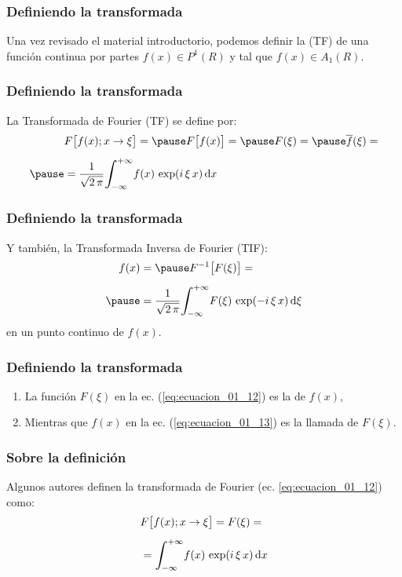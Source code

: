 \begin{frame}
\frametitle{Definiendo la transformada}
Una vez revisado el material introductorio, \pause podemos definir la  (TF) de una función continua por partes $f (x) \in P^{1} (R)$ y tal que $f (x) \in A_{1} (R)$.
\end{frame}
\begin{frame}
\frametitle{Definiendo la transformada}
La Transformada de Fourier (TF) se define por:
\pause
\begin{eqnarray}
\begin{aligned}[b]
&F \big[ f (x); x \to \xi \big] = \pause F \big[ f (x) \big] = \pause F (\xi) = \pause \overline{f} (\xi) = \\[0.5em] \pause
&= \dfrac{1}{\sqrt{2 \, \pi}} \scaleint{6ex}_{\bs -\infty}^{+\infty} f (x) \, \exp(i \, \xi \, x) \dd{x}
\end{aligned}
\label{eq:ecuacion_01_12}
\end{eqnarray}
\end{frame}
\begin{frame}
\frametitle{Definiendo la transformada}
Y también, la Transformada Inversa de Fourier (TIF):
\pause
\begin{eqnarray}
\begin{aligned}[b]
f (x) &= \pause F^{-1} \big[ F (\xi) \big] = \\[0.5em] \pause
&= \dfrac{1}{\sqrt{2 \, \pi}} \scaleint{6ex}_{\bs -\infty}^{+\infty} F (\xi) \, \exp(-i \, \xi \, x) \dd{\xi}
\label{eq:ecuacion_01_13}
\end{aligned}
\end{eqnarray}
en un punto continuo de $f (x)$.
\end{frame}
\begin{frame}
\frametitle{Definiendo la transformada}
\begin{enumerate}[<+->]
\item La función $F (\xi)$ en la ec. (\ref{eq:ecuacion_01_12}) es la  de $f (x)$,
\item Mientras que $f (x)$ en la ec. (\ref{eq:ecuacion_01_13}) es la llamada  de $F (\xi)$.
\end{enumerate}
\end{frame}
\begin{frame}
\frametitle{Sobre la definición}
Algunos autores definen la transformada de Fourier  (ec. \ref{eq:ecuacion_01_12}) como:
\pause
\begin{eqnarray}
\begin{aligned}[b]
&F \big[ f (x); x \to \xi \big] = F (\xi) = \\[0.5em]
&= \scaleint{6ex}_{\bs -\infty}^{+\infty} f (x) \, \exp(i \, \xi \, x) \dd{x}
\label{eq:ecuacion_01_14}
\end{aligned}
\end{eqnarray}
\end{frame}
